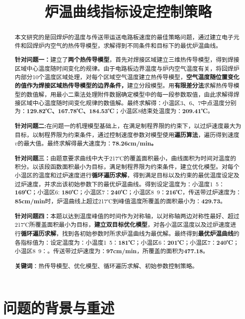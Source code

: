\documentclass[withoutpreface,bwprint]{cumcmthesis} %
\title{炉温曲线指标设定控制策略}
\numberwithin{equation}{subsection}
\begin{document}
 \maketitle
 \begin{abstract}
本文研究的是回焊炉的温度与传送带运送电路板速度的最佳策略问题，通过建立电子元件和回焊炉内空气的热传导模型，求解得到不同条件和目标下的最优炉温曲线。

\textbf{针对问题一：}建立了\textbf{两个热传导模型}，首先对焊接区域建立三维热传导模型，得到焊接区域中心温度随时间变化的规律。由于电路板边界温度与炉内空气温度有关，将回焊炉内部分10个温度区域处理，对每个区域空气温度建立热传导模型，\textbf{空气温度随位置变化的值作为焊接区域热传导模型的边界条件，}建立分段模型。用\textbf{有限差分法}求解热传导模型的数值解，用最小二乘法处理附件数据确定模型中的每一段参数取值，由此求解得焊接区域中心温度随时间变化规律的数值解。最终求解得：小温区3、6、7中点温度分别为：\textbf{129.82℃、167.78℃、184.53℃}；小温区8结束处温度为：\textbf{209.41℃}。

\textbf{针对问题二:}在问题一的机理模型基础上，在满足制程界限的约束下，以过炉速度最大为目标，以制程界限为约束条件，通过控制速度参数对模型使用\textbf{遍历算法}，遍历得到速度$v$的最大值。最终求解得最大速度为：\textbf{78.26cm/min。}

\textbf{针对问题三：}由题意要求曲线中大于217℃的覆盖面积最小，曲线面积为时间对温度的积分。以该段函数面积最小为目标，满足制程界限为约束条件，建立优化模型。对每个小温区的温度和过炉速度进行\textbf{循环遍历求解}，得到满足目标以及约束的最优温度设定及过炉速度，并求出该初始参数下的最优炉温曲线。得到设定温度为：小温度1~5：\textbf{169℃}；小温区6: \textbf{180℃}；小温区7：\textbf{240℃}；小温区8~9：\textbf{216℃}，传送带过炉速度为：\textbf{85cm/min}时，炉温曲线上超过217℃到峰值温度所覆盖的面积最小为：\textbf{429.73}。

\textbf{针对问题四：}本题以达到温度峰值的时间作为对称轴，以对称轴两边对称性最好、超过217℃所覆盖面积最小为目标，\textbf{建立双目标优化模型}，对各小温区温度以及过炉速度进行\textbf{循环遍历求解}，找到各初始参数时所求炉温曲线为最优解。最终得到\textbf{最优炉温曲线}的各指标值为：设定温度为：小温度1~5：\textbf{181℃}；小温区6：\textbf{201℃}；小温区7：\textbf{240℃}；小温区8~9：。传送带过炉速度为：\textbf{97cm/min}，所覆盖的面积为\textbf{477.18}。

\textbf{关键词}：热传导模型、优化模型、循环遍历求解、初始参数控制策略。
\end{abstract}





\section{问题的背景与重述}
\end{document}

